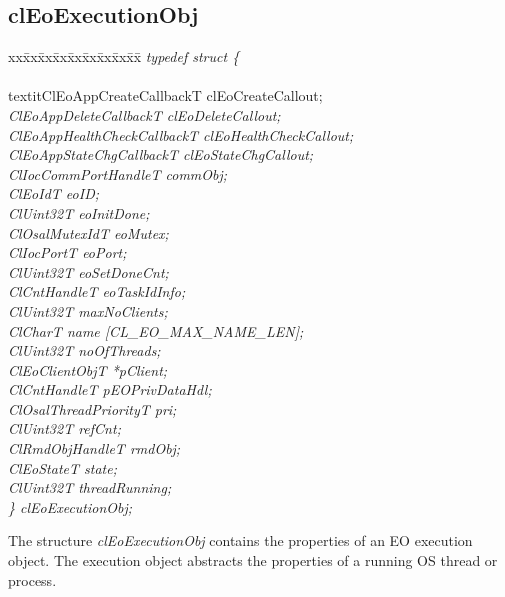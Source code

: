 \subsection{clEoExecutionObj}
\begin{tabbing}
xx\=xx\=xx\=xx\=xx\=xx\=xx\=xx\=xx\=\kill
\textit{typedef struct \{}\\
\>\>\>\\textit{ClEoAppCreateCallbackT clEoCreateCallout;}\\
\>\>\>\>\textit{ClEoAppDeleteCallbackT clEoDeleteCallout;}\\
\>\>\>\>\textit{ClEoAppHealthCheckCallbackT clEoHealthCheckCallout;}\\
\>\>\>\>\textit{ClEoAppStateChgCallbackT clEoStateChgCallout;}\\
\>\>\>\>\textit{ClIocCommPortHandleT commObj;}\\
\>\>\>\>\textit{ClEoIdT eoID;}\\
\>\>\>\>\textit{ClUint32T eoInitDone;}\\
\>\>\>\>\textit{ClOsalMutexIdT eoMutex;}\\
\>\>\>\>\textit{ClIocPortT eoPort;}\\
\>\>\>\>\textit{ClUint32T eoSetDoneCnt;}\\
\>\>\>\>\textit{ClCntHandleT eoTaskIdInfo;}\\
\>\>\>\>\textit{ClUint32T maxNoClients;}\\
\>\>\>\>\textit{ClCharT name \mbox{[}CL\_EO\_MAX\_NAME\_LEN\mbox{]};}\\
\>\>\>\>\textit{ClUint32T noOfThreads;}\\
\>\>\>\>\textit{ClEoClientObjT *pClient;}\\
\>\>\>\>\textit{ClCntHandleT pEOPrivDataHdl;}\\
\>\>\>\>\textit{ClOsalThreadPriorityT pri;}\\
\>\>\>\>\textit{ClUint32T refCnt;}\\
\>\>\>\>\textit{ClRmdObjHandleT rmdObj;}\\
\>\>\>\>\textit{ClEoStateT state;}\\
\>\>\>\>\textit{ClUint32T threadRunning;}\\
\textit{\} clEoExecutionObj;}\end{tabbing}
 The structure \textit{clEoExecutionObj} contains the properties of an EO execution object.
 The execution object abstracts the properties of a running OS thread or process.
